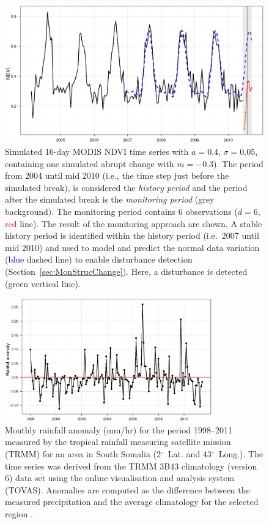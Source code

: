 \documentclass[authoryear,preprint,review,10pt]{elsarticle}
\newcommand{\degree}{\ensuremath{^\circ}}
\begin{document}
 \begin{figure}[htp]
\centering
    \includegraphics[width=1\textwidth]{figs/Fig1Sim_Monitoring_ggplot.eps}
  \caption{Simulated 16-day MODIS NDVI time series with $a = 0.4$, $\sigma = 0.05$, containing one simulated abrupt change with $m = -0.3$). The period from
  2004 until mid 2010 (i.e., the time step just before the simulated break), is considered the \emph{history period} and the period after the simulated
  break is the \emph{monitoring period} (grey background). The monitoring period contains 6 observations  ($d = 6$, \textcolor{red} {red} line). The
  result of the monitoring approach are shown. A stable history period is identified within the history period (i.e.\ 2007 until mid 2010) and used to model
  and predict the normal data variation (\textcolor{blue} {blue} dashed line) to enable disturbance detection (Section~\ref{sec:MonStrucChange}).  Here, a
  disturbance is detected (\textcolor{OliveGreen} {green} vertical line).}
  \label{fig:SimMonitor}
\end{figure}

 \begin{figure}[htp]
\centering
    \includegraphics[width=0.8\textwidth]{figs/RainfallAnomaly.eps}
  \caption{Monthly rainfall anomaly (mm/hr) for the period 1998--2011 measured by the tropical rainfall measuring satellite mission (TRMM) for an area in South Somalia (2\degree~Lat. and 43\degree~Long.). The time series was derived from the TRMM 3B43 climatology (version 6) data set using the online visualisation and analysis system (TOVAS). Anomalies are computed as the difference between the measured precipitation and the average climatology for the selected region \citep{Acker:2007vk}.}
  \label{fig:RF}
\end{figure}
\end{document}
